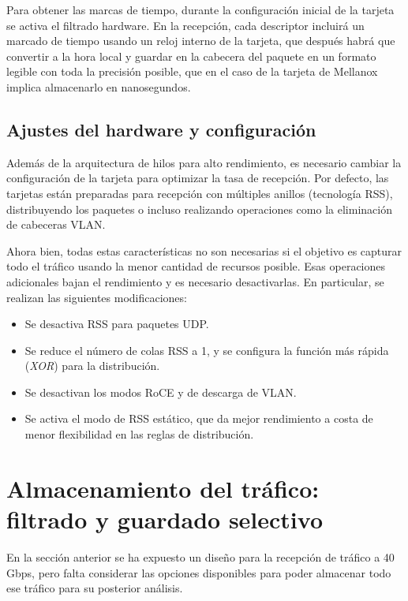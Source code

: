 \documentclass[oneside, draft]{epstfg}
\begin{document}
Para obtener las marcas de tiempo, durante la configuración inicial de la tarjeta se activa el filtrado hardware. En la recepción, cada descriptor incluirá un marcado de tiempo usando un reloj interno de la tarjeta, que después habrá que convertir a la hora local y guardar en la cabecera del paquete en un formato legible con toda la precisión posible, que en el caso de la tarjeta de Mellanox implica almacenarlo en nanosegundos.

\subsection{Ajustes del hardware y configuración}
\label{sec:Desarrollo:AjustesHardware}

Además de la arquitectura de hilos para alto rendimiento, es necesario cambiar la configuración de la tarjeta para optimizar la tasa de recepción. Por defecto, las tarjetas están preparadas para recepción con múltiples anillos (tecnología \gls{RSS}), distribuyendo los paquetes o incluso realizando operaciones como la eliminación de cabeceras VLAN.

Ahora bien, todas estas características no son necesarias si el objetivo es capturar todo el tráfico usando la menor cantidad de recursos posible. Esas operaciones adicionales bajan el rendimiento y es necesario desactivarlas. En particular, se realizan las siguientes modificaciones:

\begin{itemize}[itemsep = 0pt]
\item Se desactiva \gls{RSS} para paquetes UDP.
\item Se reduce el número de colas \gls{RSS} a 1, y se configura la función más rápida (\textit{XOR}) para la distribución.
\item Se desactivan los modos \gls{RoCE} y de descarga de VLAN.
\item Se activa el modo de \gls{RSS} estático, que da mejor rendimiento a costa de menor flexibilidad en las reglas de distribución.
\end{itemize}

\section{Almacenamiento del tráfico: filtrado y guardado selectivo}

En la sección anterior se ha expuesto un diseño para la recepción de tráfico a 40 Gbps, pero falta considerar las opciones disponibles para poder almacenar todo ese tráfico para su posterior análisis.
\end{document}
